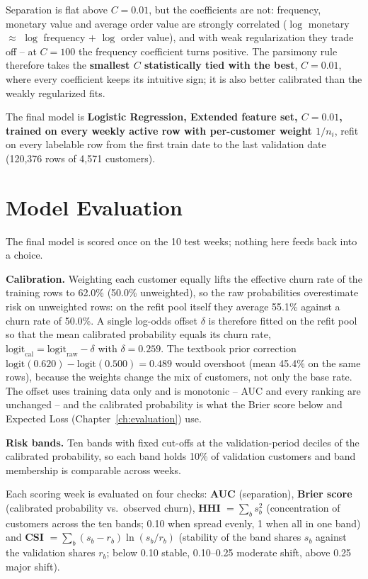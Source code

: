 Separation is flat above $C = 0.01$, but the coefficients are not: frequency, monetary value and average order value are strongly correlated ($\log$ monetary $\approx$ $\log$ frequency $+$ $\log$ order value), and with weak regularization they trade off -- at $C = 100$ the frequency coefficient turns positive. The parsimony rule therefore takes the \textbf{smallest $C$ statistically tied with the best}, $C = 0.01$, where every coefficient keeps its intuitive sign; it is also better calibrated than the weakly regularized fits.

The final model is \textbf{Logistic Regression, Extended feature set, $C = 0.01$, trained on every weekly active row with per-customer weight $1/n_i$}, refit on every labelable row from the first train date to the last validation date (120,376 rows of 4,571 customers).

\section{Model Evaluation}
\label{sec:6-quality}

The final model is scored once on the 10 test weeks; nothing here feeds back into a choice.

\textbf{Calibration.} Weighting each customer equally lifts the effective churn rate of the training rows to 62.0\% (50.0\% unweighted), so the raw probabilities overestimate risk on unweighted rows: on the refit pool itself they average 55.1\% against a churn rate of 50.0\%. A single log-odds offset $\delta$ is therefore fitted on the refit pool so that the mean calibrated probability equals its churn rate, $\text{logit}_{\text{cal}} = \text{logit}_{\text{raw}} - \delta$ with $\delta = 0.259$. The textbook prior correction $\text{logit}(0.620) - \text{logit}(0.500) = 0.489$ would overshoot (mean 45.4\% on the same rows), because the weights change the mix of customers, not only the base rate. The offset uses training data only and is monotonic -- AUC and every ranking are unchanged -- and the calibrated probability is what the Brier score below and Expected Loss (Chapter~\ref{ch:evaluation}) use.

\textbf{Risk bands.} Ten bands with fixed cut-offs at the validation-period deciles of the calibrated probability, so each band holds 10\% of validation customers and band membership is comparable across weeks.

Each scoring week is evaluated on four checks: \textbf{AUC} (separation), \textbf{Brier score} (calibrated probability vs.\ observed churn), \textbf{HHI} $= \sum_b s_b^2$ (concentration of customers across the ten bands; 0.10 when spread evenly, 1 when all in one band) and \textbf{CSI} $= \sum_b (s_b - r_b)\ln(s_b / r_b)$ (stability of the band shares $s_b$ against the validation shares $r_b$; below 0.10 stable, 0.10--0.25 moderate shift, above 0.25 major shift).


